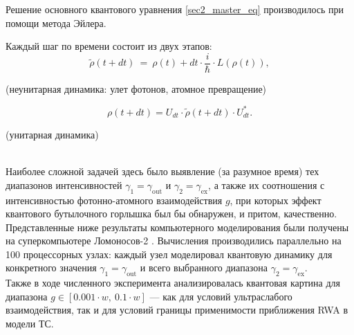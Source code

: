\begin{enumerate}
{Решение основного квантового уравнения \eqref{sec2_master_eq} производилось при помощи метода Эйлера.

\clearpage
\begin{figure}[h!]
	\noindent{}
\end{figure}

\clearpage
Каждый шаг по времени состоит из двух этапов:
\[
\tilde{\rho}(t+dt)\ =\ \rho(t)+dt\cdot \frac{i}{\hbar}\cdot L(\rho(t)),
\]
\begin{center}
	\text(неунитарная динамика: улет фотонов, атомное превращение)
\end{center}
\[
\rho(t+dt)=U_{dt}\cdot \tilde{\rho}(t+dt)\cdot U_{dt}^{*}.
\]
\begin{center}\text(унитарная динамика)\end{center}
\
\\
Наиболее сложной задачей здесь было выявление (за разумное время) тех диапазонов интенсивностей $\gamma_{1} = \gamma_{\text{out}}$ и
$\gamma_{2} = \gamma_{\text{ex}}$, а также их соотношения с интенсивностью фотонно-атомного взаимодействия $g$, при которых эффект квантового бутылочного горлышка был бы обнаружен, и притом, качественно.\\[12pt]

Представленные ниже результаты компьютерного моделирования были получены на суперкомпьютере Ломоносов-2 \cite{lomonosov_2}. Вычисления производились параллельно на 100 процессорных узлах: каждый узел моделировал квантовую динамику для конкретного значения $\gamma_{1} = \gamma_{\text{out}}$ и всего выбранного диапазона $\gamma_{2} = \gamma_{\text{ex}}$.\\[12pt]

Также в ходе численного эксперимента анализировалась квантовая картина для диапазона $g \in [0.001 \cdot w,~0.1 \cdot w]$ --- как для условий ультраслабого взаимодействия, так и для условий границы применимости приближения RWA \cite{rwa_rabi_1,rwa_rabi_2,ozhigov_qq} в модели ТС.
}
\end{enumerate}


